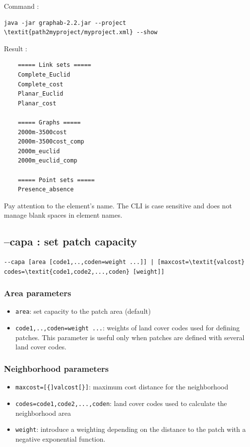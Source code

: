 \documentclass[a4paper,10pt]{report}
\begin{document}
Command :
\begin{Verbatim}[commandchars=\\\{\}]
java -jar graphab-2.2.jar --project \textit{path2myproject/myproject.xml} --show
\end{Verbatim}
Result :
\begin{Verbatim}
	===== Link sets =====
	Complete_Euclid
	Complete_cost
	Planar_Euclid
	Planar_cost
	
	===== Graphs =====
	2000m-3500cost
	2000m-3500cost_comp
	2000m_euclid
	2000m_euclid_comp
	
	===== Point sets =====
	Presence_absence
\end{Verbatim}
Pay attention to the element's name. The CLI is case sensitive and does not manage blank spaces in element names.

\subsection{--capa : set patch capacity}
\begin{Verbatim}[commandchars=\\\{\}]
--capa [area [code1,..,coden=weight ...]] | [maxcost=\textit{valcost} codes=\textit{code1,code2,...,coden} [weight]]
\end{Verbatim}

\subsubsection{Area parameters}
\begin{itemize}
	\item \verb|area|: set capacity to the patch area (default)
	\item \verb|code1,..,coden=weight ...|: weights of land cover codes used for defining patches. This parameter is useful only when patches are defined with several land cover codes.
\end{itemize}

\subsubsection{Neighborhood parameters}
\begin{itemize}
	\item \verb|maxcost=[{]valcost[}]|: maximum cost distance for the neighborhood
	\item \verb|codes=code1,code2,...,coden|: land cover codes used to calculate the neighborhood area
	\item \verb|weight|: introduce a weighting depending on the distance to the patch with a negative exponential function.
\end{itemize}
\end{document}
